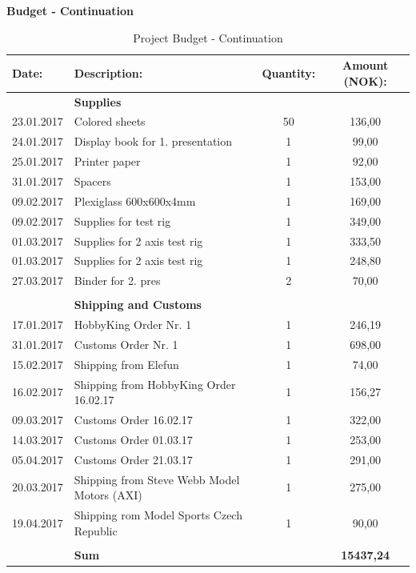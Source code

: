 \begin{table}[H]
\begin{center}
\textbf{\Large Budget - Continuation}
\end{center}
\caption{Project Budget - Continuation }
\label{tab:budgetcont}
\begin{tabular}{|l|l|c|c|}
\rowcolor{cadetgrey}
\centering \textbf{Date:}    &\textbf{Description:} 	 &\textbf{Quantity:} & \textbf{Amount (NOK): } \\ %
\hline
\rowcolor{gainsboro} & \textbf{Supplies} & & \\ 
                        23.01.2017 & Colored sheets & 50 & 136,00 \\
\rowcolor{gainsboro}    24.01.2017 & Display book for 1. presentation & 1 & 99,00  \\
                        25.01.2017 & Printer paper  & 1 & 92,00 \\
\rowcolor{gainsboro}    31.01.2017 & Spacers & 1 & 153,00   \\
                        09.02.2017 & Plexiglass 600x600x4mm & 1 & 169,00 \\
\rowcolor{gainsboro}    09.02.2017 & Supplies for test rig & 1 & 349,00   \\
                        01.03.2017 & Supplies for 2 axis test rig  & 1 & 333,50 \\
\rowcolor{gainsboro}    01.03.2017 & Supplies for 2 axis test rig  & 1 & 248,80  \\
                        27.03.2017 & Binder for 2. pres  & 2 & 70,00 \\
\rowcolor{gainsboro}    &  &  &   \\
                        & \textbf{Shipping and Customs} &  & \\
\rowcolor{gainsboro}    17.01.2017 & HobbyKing Order Nr. 1 & 1 & 246,19  \\
                        31.01.2017 & Customs Order Nr. 1 & 1 & 698,00\\
\rowcolor{gainsboro}    15.02.2017 & Shipping from Elefun & 1 & 74,00  \\
                        16.02.2017 & Shipping from HobbyKing Order 16.02.17 & 1 & 156,27 \\
\rowcolor{gainsboro}    09.03.2017 & Customs Order 16.02.17 & 1 & 322,00  \\
                        14.03.2017 & Customs Order 01.03.17 & 1 & 253,00 \\
\rowcolor{gainsboro}    05.04.2017 & Customs Order 21.03.17 & 1 & 291,00  \\
                        20.03.2017 & Shipping from Steve Webb Model Motors (AXI) & 1  & 275,00 \\
\rowcolor{gainsboro}    19.04.2017 & Shipping rom Model Sports Czech Republic  & 1 & 90,00  \\
                        &  &  & \\
\rowcolor{gainsboro}    &  \textbf{\large Sum} &  & \textbf{\large  15437,24}   \\
\hline
\end{tabular}                                                               
\end{table}





